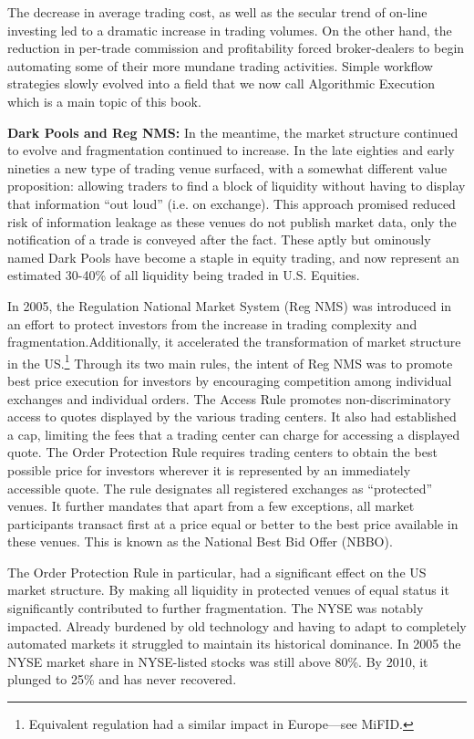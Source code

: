 The decrease in average trading cost, as well as the secular trend of on-line investing led to a dramatic increase in trading volumes. On the other hand, the reduction in per-trade commission and profitability forced broker-dealers to begin automating some of their more mundane trading activities. Simple workflow strategies slowly evolved into a field that we now call Algorithmic Execution which is a main topic of this book. \twomedskip


\noindent\textbf{Dark Pools and Reg NMS:} In the meantime, the market structure continued to evolve and fragmentation continued to increase. In the late eighties and early nineties a new type of trading venue surfaced, with a somewhat different value proposition: allowing traders to find a block of liquidity without having to display that information ``out loud'' (i.e. on exchange). This approach promised reduced risk of information leakage as these venues do not publish market data, only the notification of a trade is conveyed after the fact.  These aptly but ominously named Dark Pools have become a staple in equity trading, and now represent an estimated 30-40\% of all liquidity being traded in U.S. Equities. \twomedskip


In 2005, the Regulation National Market System (Reg NMS) was introduced in an effort to protect investors from the increase in trading complexity and fragmentation.Additionally, it accelerated the transformation of market structure in the US.\footnote{Equivalent regulation had a similar impact in Europe---see MiFID.} Through its two main rules, the intent of Reg NMS was to promote best price execution for investors by encouraging competition among individual exchanges and individual orders. The Access Rule promotes non-discriminatory access to quotes displayed by the various trading centers. It also had established a cap, limiting the fees that a trading center can charge for accessing a displayed quote. The Order Protection Rule requires trading centers to obtain the best possible price for investors wherever it is represented by an immediately accessible quote. The rule designates all registered exchanges as ``protected'' venues. It further mandates that apart from a few exceptions, all market participants transact first at a price equal or better to the best price available in these venues. This is known as the National Best Bid Offer (NBBO). 


The Order Protection Rule in particular, had a significant effect on the US market structure. By making all liquidity in protected venues of equal status it significantly contributed to further fragmentation. The NYSE was notably impacted. Already burdened by old technology and having to adapt to completely automated markets it struggled to maintain its historical dominance. In 2005 the NYSE market share in NYSE-listed stocks was  still above 80\%. By 2010, it plunged to 25\% and has never recovered.


